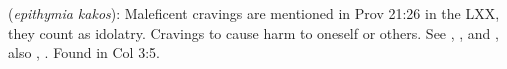 \item[Maleficent craving,]

(\textit{epithymia kakos}):
Maleficent cravings are mentioned in Prov 21:26 in the LXX, they count as idolatry. Cravings to cause harm to oneself or others. See , , and , also , .
Found in Col 3:5.
